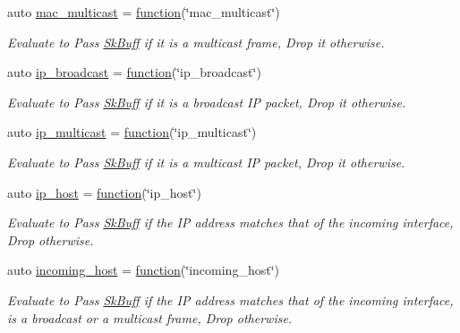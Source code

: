 \begin{DoxyCompactItemize}
auto \hyperlink{namespacepfq_1_1lang_1_1experimental_1_1anonymous__namespace_02experimental_8hpp_03_a0c39849f9e3e8677342842f88a8ee37c}{mac\+\_\+multicast} = \hyperlink{namespacepfq_1_1lang_a1a4638059d700ae08d0ca63886ff2bb3}{function}(\char`\"{}mac\+\_\+multicast\char`\"{})
\begin{DoxyCompactList}\small\item\em Evaluate to {\ttfamily Pass} \hyperlink{structpfq_1_1lang_1_1SkBuff}{Sk\+Buff} if it is a multicast frame, {\ttfamily Drop} it otherwise. \end{DoxyCompactList}\item 
auto \hyperlink{namespacepfq_1_1lang_1_1experimental_1_1anonymous__namespace_02experimental_8hpp_03_a5fbdc84e9899dc881ed25e37fbdddabc}{ip\+\_\+broadcast} = \hyperlink{namespacepfq_1_1lang_a1a4638059d700ae08d0ca63886ff2bb3}{function}(\char`\"{}ip\+\_\+broadcast\char`\"{})
\begin{DoxyCompactList}\small\item\em Evaluate to {\ttfamily Pass} \hyperlink{structpfq_1_1lang_1_1SkBuff}{Sk\+Buff} if it is a broadcast IP packet, {\ttfamily Drop} it otherwise. \end{DoxyCompactList}\item 
auto \hyperlink{namespacepfq_1_1lang_1_1experimental_1_1anonymous__namespace_02experimental_8hpp_03_ab9e6818d6b72bab5885dda6212a3ba52}{ip\+\_\+multicast} = \hyperlink{namespacepfq_1_1lang_a1a4638059d700ae08d0ca63886ff2bb3}{function}(\char`\"{}ip\+\_\+multicast\char`\"{})
\begin{DoxyCompactList}\small\item\em Evaluate to {\ttfamily Pass} \hyperlink{structpfq_1_1lang_1_1SkBuff}{Sk\+Buff} if it is a multicast IP packet, {\ttfamily Drop} it otherwise. \end{DoxyCompactList}\item 
auto \hyperlink{namespacepfq_1_1lang_1_1experimental_1_1anonymous__namespace_02experimental_8hpp_03_ab651cc72b27d482a4ae6c415f50780cd}{ip\+\_\+host} = \hyperlink{namespacepfq_1_1lang_a1a4638059d700ae08d0ca63886ff2bb3}{function}(\char`\"{}ip\+\_\+host\char`\"{})
\begin{DoxyCompactList}\small\item\em Evaluate to {\ttfamily Pass} \hyperlink{structpfq_1_1lang_1_1SkBuff}{Sk\+Buff} if the IP address matches that of the incoming interface, {\ttfamily Drop} otherwise. \end{DoxyCompactList}\item 
auto \hyperlink{namespacepfq_1_1lang_1_1experimental_1_1anonymous__namespace_02experimental_8hpp_03_ac6e38127701ae032cf44cb9527131feb}{incoming\+\_\+host} = \hyperlink{namespacepfq_1_1lang_a1a4638059d700ae08d0ca63886ff2bb3}{function}(\char`\"{}incoming\+\_\+host\char`\"{})
\begin{DoxyCompactList}\small\item\em Evaluate to {\ttfamily Pass} \hyperlink{structpfq_1_1lang_1_1SkBuff}{Sk\+Buff} if the IP address matches that of the incoming interface, is a broadcast or a multicast frame, {\ttfamily Drop} otherwise. \end{DoxyCompactList}\end{DoxyCompactItemize}


